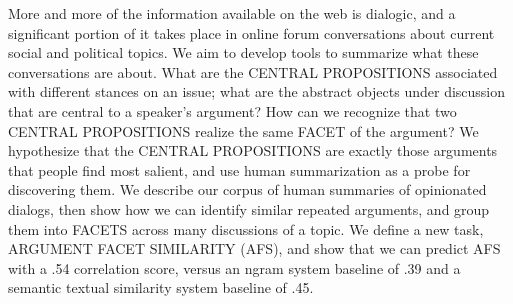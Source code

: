 More and more of the information available on the web is dialogic, and a significant portion of it takes place in online forum conversations about current social and political topics. We aim to develop tools to summarize what these conversations are about. What are the CENTRAL PROPOSITIONS associated with different stances on an issue; what are the abstract objects under discussion that are central to a speaker's argument? How can we recognize that two CENTRAL PROPOSITIONS realize the same FACET of the argument? We hypothesize that the CENTRAL PROPOSITIONS are exactly those arguments that people find most salient, and use human summarization as a probe for discovering them. We describe our corpus of human summaries of opinionated dialogs, then show how we can identify similar repeated arguments, and group them into FACETS across many discussions of a topic. We define a new task, ARGUMENT FACET SIMILARITY (AFS), and show that we can predict AFS with a .54 correlation score, versus an ngram system baseline of .39 and a semantic textual similarity system baseline of .45.
